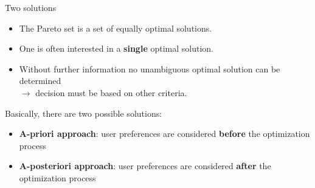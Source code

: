 %
%
%


\begin{frame}{Two solutions}

\begin{itemize}
\item The Pareto set is a set of equally optimal solutions.
\item One is often interested in a \textbf{single} optimal solution.
\item Without further information no unambiguous optimal solution can be determined \\
$\to$ decision must be based on other criteria.
\end{itemize}

Basically, there are two possible solutions:
\begin{itemize}
\item \textbf{A-priori approach}: user preferences are considered \textbf{before} the optimization process
\item \textbf{A-posteriori approach}: user preferences are considered \textbf{after} the optimization process
\end{itemize}

\end{frame}

